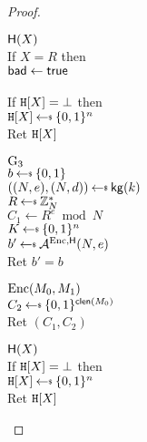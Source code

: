 \begin{proof}
\begin{center}
{\underline{$\mathsf{H}(X)$}\\
If $X = R$ then\\
\myInd $\mathsf{bad}\gets\mathsf{true}$\\
\myInd {}\\
If $\mathtt{H}[X] = \bot$  then\\
\myInd $\TabH[X] \getsr \bits^n$\\
Ret $\mathtt{H}[X]$
}{
\underline{${{\textnormal G}}_3$}\\ %
$b \getsr \bits$\\
$((N,e),(N,d)) \getsr \kg(k)$\\
$R \getsr \Z^*_N$\\
$C_1 \gets R^e \bmod N$\\
$K \getsr \bits^n$\\
$b' \getsr \advA^{\EncOracle,\Horacle}(N,e)$\\
Ret $b'=b$\medskip

\underline{$\textnormal{Enc}(M_0,M_1)$}\\
$C_2 \getsr \bits^{\ctxtlen(M_0)}$\\
Ret $(C_1,C_2)$\medskip

\underline{$\mathsf{H}(X)$}\\
If $\mathtt{H}[X] = \bot$  then\\
\myInd $\TabH[X] \getsr \bits^n$\\
Ret $\mathtt{H}[X]$
}

\end{center}


\end{proof}

